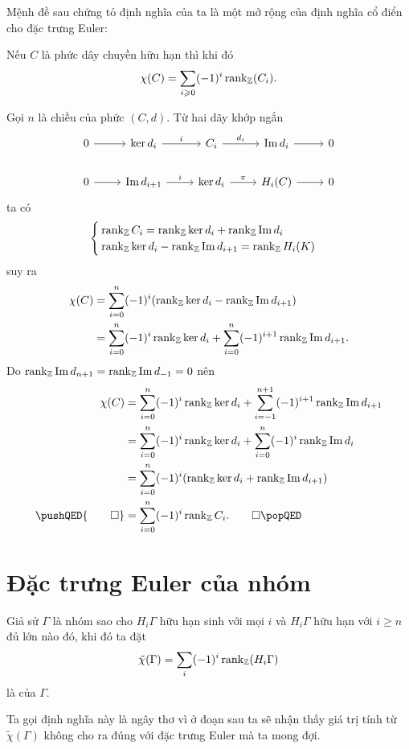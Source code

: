 Mệnh đề sau chứng tỏ định nghĩa của ta là một mở rộng của định nghĩa cổ điển cho đặc trưng Euler:
\begin{proposition}
    Nếu $C$ là phức dây chuyền hữu hạn thì khi đó
    $$
        \chi(C) = \sum_{i \geqslant 0} (-1)^i \operatorname{rank}_{\mathbb Z}(C_i).
    $$
\end{proposition}
\startproof Gọi $n$ là chiều của phức $(C,d)$. Từ hai dãy khớp ngắn
$$
    \begin{tikzcd}
        0 \arrow[r] & \ker d_i \arrow[r, "i"] & C_i \arrow[r, "d_i"] & \im d_{i} \arrow[r] & 0\\
        0 \arrow[r] & \im d_{i+1} \arrow[r, "i"] & \ker d_i \arrow[r, "\pi"] & H_i(C) \arrow[r] & 0
    \end{tikzcd}
$$
ta có
$$
    \begin{cases}
        \operatorname{rank}_{\mathbb Z} C_i = \operatorname{rank}_{\mathbb Z}\ker d_i + \operatorname{rank}_{\mathbb Z} \operatorname{Im} d_{i} \\
        \operatorname{rank}_{\mathbb Z}\ker d_i - \operatorname{rank}_{\mathbb Z} \operatorname{Im} d_{i+1} = \operatorname{rank}_{\mathbb Z} H_i(K)
    \end{cases}
$$
suy ra
\begin{align*}
    \chi(C) & = \sum_{i = 0}^n (-1)^i (\operatorname{rank}_{\mathbb Z} \ker d_i -  \operatorname{rank}_{\mathbb Z} \operatorname{Im} d_{i+1})                     \\
            & = \sum_{i=0}^n (-1)^i \operatorname{rank}_{\mathbb Z} \ker d_i + \sum_{i=0}^n (-1)^{i+1} \operatorname{rank}_{\mathbb Z} \operatorname{Im} d_{i+1}.
\end{align*}
Do $\operatorname{rank}_{\mathbb Z} \operatorname{Im} d_{n+1} = \operatorname{rank}_{\mathbb Z} \operatorname{Im} d_{-1} = 0$ nên
\begin{align*}
    \chi(C) & = \sum_{i=0}^{n} (-1)^i \rank_{\Z} \ker d_i + \sum_{i=-1}^{n+1} (-1)^{i+1} \rank_{\Z} \im d_{i+1} \\
            & = \sum_{i=0}^{n} (-1)^i \rank_{\Z} \ker d_i + \sum_{i=0}^{n} (-1)^{i} \rank_{\Z} \im d_{i}        \\
            & = \sum_{i=0}^{n} (-1)^i (\rank_{\Z} \ker d_i + \rank_{\Z} \im d_{i+1})                            \\
    \pushQED{\qed}
            & = \sum_{i=0}^{n} (-1)^i \rank_{\Z}C_i.
    \qedhere
    \popQED
\end{align*}

\section{Đặc trưng Euler của nhóm}

\begin{define}
    Giả sử $\Gamma$ là nhóm sao cho $H_i \Gamma$ hữu hạn sinh với mọi $i$ và $H_i \Gamma$ hữu hạn với $i \geq n$ đủ lớn nào đó, khi đó ta đặt
    $$
        \tilde{\chi}(\Gamma) = \sum_i (-1)^i \operatorname{rank}_{\mathbb Z} (H_i \Gamma)
    $$
    là  của $\Gamma$.

    Ta gọi định nghĩa này là ngây thơ vì ở đoạn sau ta sẽ nhận thấy giá trị tính từ $\tilde{\chi}(\Gamma)$ không cho ra đúng với đặc trưng Euler mà ta mong đợi.
\end{define}

